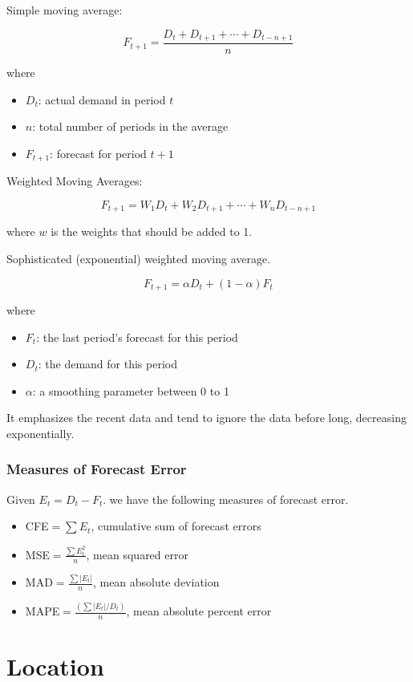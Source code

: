 \documentclass{article}
\begin{document}
Simple moving average:

\[
	F_{t+1} = \dfrac{
		D_t + D_{t+1} + \cdots + D_{t-n+1}
	}{n}
\]

where
\begin{itemize}
	\item $D_t$: actual demand in period $t$
	\item $n$: total number of periods in the average
	\item $F_{t+1}$: forecast for period $t+1$
\end{itemize}

Weighted Moving Averages:

\[
	F_{t+1} = W_1D_t + W_2D_{t+1} + \cdots + W_nD_{t-n+1}
\]

where $w$ is the weights that should be added to 1.

Sophisticated (exponential) weighted moving average.

\[
	F_{t+1} = \alpha D_t + (1-\alpha)F_t
\]

where
\begin{itemize}
	\item $F_t$: the last period's forecast for this period
	\item $D_t$: the demand for this period
	\item $\alpha$: a smoothing parameter between 0 to 1
\end{itemize}

It emphasizes the recent data and tend to ignore the data before long,
decreasing exponentially.

\subsubsection{Measures of Forecast Error}

Given $E_t = D_t - F_t$. we have the following measures of forecast error.

\begin{itemize}
	\item CFE$=\sum E_t$, cumulative sum of forecast errors
	\item MSE$=\frac{\sum E_t^2}{n}$, mean squared error
	\item MAD$=\frac{\sum |E_t|}{n}$, mean absolute deviation
	\item MAPE$=\frac{
			      (\sum |E_t| / D_t)
		      }{n}$, mean absolute percent error
\end{itemize}


\section{Location}
\end{document}

